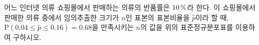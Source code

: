 \noindent\begin{minipage}[t]{0.58\linewidth}\vspace{0pt}\raggedright 어느 인터넷 의류 쇼핑몰에서 판매하는 의류의 반품률은 $10\mkern3mu \%$라 한다. 이 쇼핑몰에서 판매한 의류 중에서 임의추출한 크기가 $n$인 표본의 표본비율을 $\hat{p}$이라 할 때, $\mathrm{P}(0.04\le\hat{p}\le 0.16)=0.68$을 만족시키는 $n$의 값을 위의 표준정규분포표를 이용하여 구하시오.\end{minipage}\hfill\begin{minipage}[t]{0.4\linewidth}\vspace{0pt}\centering \resizebox{\ifdim\width>\linewidth\linewidth\else\width\fi}{!}{}\end{minipage}\par
